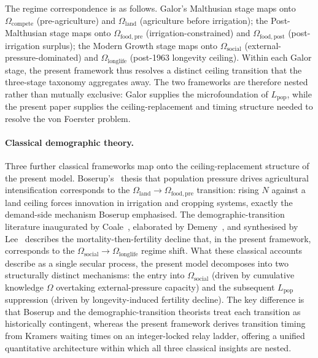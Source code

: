 \documentclass[11pt]{article}
\begin{document}
The regime correspondence is as follows.
Galor's Malthusian stage maps onto $\Omega_{\mathrm{compete}}$ (pre-agriculture)
and $\Omega_{\mathrm{land}}$ (agriculture before irrigation);
the Post-Malthusian stage maps onto $\Omega_{\mathrm{food,pre}}$ (irrigation-constrained)
and $\Omega_{\mathrm{food,post}}$ (post-irrigation surplus);
the Modern Growth stage maps onto $\Omega_{\mathrm{social}}$ (external-pressure-dominated)
and $\Omega_{\mathrm{longlife}}$ (post-1963 longevity ceiling).
Within each Galor stage, the present framework thus resolves a distinct
ceiling transition that the three-stage taxonomy aggregates away.
The two frameworks are therefore nested rather than mutually exclusive:
Galor supplies the microfoundation of $L_{\mathrm{pop}}$, while the present
paper supplies the ceiling-replacement and timing structure needed to
resolve the von Foerster problem.

\paragraph{Classical demographic theory.}
Three further classical frameworks map onto the ceiling-replacement
structure of the present model.
Boserup's~\cite{boserup1965} thesis that population pressure drives
agricultural intensification corresponds to the
$\Omega_{\mathrm{land}}\to\Omega_{\mathrm{food,pre}}$ transition:
rising $N$ against a land ceiling forces innovation in irrigation and
cropping systems, exactly the demand-side mechanism Boserup emphasised.
The demographic-transition literature inaugurated by
Coale~\cite{coale1973}, elaborated by Demeny~\cite{demeny1968}, and
synthesised by Lee~\cite{lee1987} describes the mortality-then-fertility
decline that, in the present framework, corresponds to the
$\Omega_{\mathrm{social}}\to\Omega_{\mathrm{longlife}}$ regime shift.
What these classical accounts describe as a single secular process, the
present model decomposes into two structurally distinct mechanisms:
the entry into $\Omega_{\mathrm{social}}$ (driven by cumulative
knowledge $\Omega$ overtaking external-pressure capacity) and the
subsequent $L_{\mathrm{pop}}$ suppression (driven by longevity-induced
fertility decline).
The key difference is that Boserup and the demographic-transition
theorists treat each transition as historically contingent, whereas the
present framework derives transition timing from Kramers waiting times
on an integer-locked relay ladder, offering a unified quantitative
architecture within which all three classical insights are nested.
\end{document}
